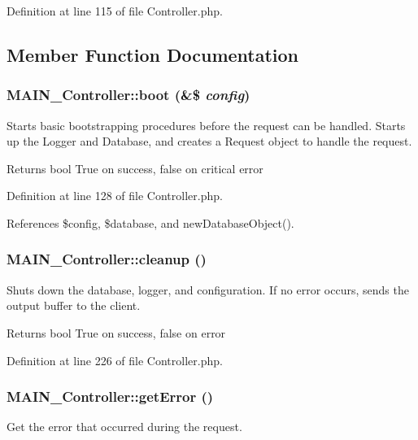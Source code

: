 Definition at line 115 of file Controller.php.

\subsection{Member Function Documentation}
\hypertarget{classMAIN__Controller_a5c77de67c4b47bcda0c997a5db3f32fa}{
\subsubsection[{boot}]{\setlength{\rightskip}{0pt plus 5cm}MAIN\_\-Controller::boot (\&\$ {\em config})}}
\label{d0/d6f/classMAIN__Controller_a5c77de67c4b47bcda0c997a5db3f32fa}
Starts basic bootstrapping procedures before the request can be handled. Starts up the Logger and Database, and creates a Request object to handle the request.

\begin{DoxyReturn}{Returns}
bool True on success, false on critical error 
\end{DoxyReturn}


Definition at line 128 of file Controller.php.

References \$config, \$database, and newDatabaseObject().\hypertarget{classMAIN__Controller_a6400bbd98dfe782c6c54b46e035a92c1}{
\subsubsection[{cleanup}]{\setlength{\rightskip}{0pt plus 5cm}MAIN\_\-Controller::cleanup ()}}
\label{d0/d6f/classMAIN__Controller_a6400bbd98dfe782c6c54b46e035a92c1}
Shuts down the database, logger, and configuration. If no error occurs, sends the output buffer to the client.

\begin{DoxyReturn}{Returns}
bool True on success, false on error 
\end{DoxyReturn}


Definition at line 226 of file Controller.php.\hypertarget{classMAIN__Controller_a8d9ca0c2bdd69d2d18fa90de23acc2de}{
\subsubsection[{getError}]{\setlength{\rightskip}{0pt plus 5cm}MAIN\_\-Controller::getError ()}}
\label{d0/d6f/classMAIN__Controller_a8d9ca0c2bdd69d2d18fa90de23acc2de}
Get the error that occurred during the request.

